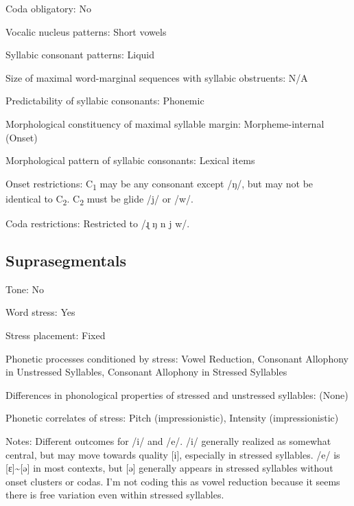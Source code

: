 {\begin{appendixdesc}
\item[Coda obligatory:] No

\item[Vocalic nucleus patterns:] Short vowels

\item[Syllabic consonant patterns:] Liquid

\item[Size of maximal word-marginal sequences with syllabic obstruents:] N/A

\item[Predictability of syllabic consonants:] Phonemic

\item[Morphological constituency of maximal syllable margin:] Morpheme-internal (Onset)

\item[Morphological pattern of syllabic consonants:] Lexical items

\item[Onset restrictions:] C\textsubscript{1} may be any consonant except /ŋ/, but may not be identical to C\textsubscript{2}. C\textsubscript{2} must be glide /j/ or /w/. 

\item[Coda restrictions:] Restricted to /ɻ ŋ n j w/.
\end{appendixdesc}
\subsection*{Suprasegmentals}
\begin{appendixdesc}
\item[Tone:] No

\item[Word stress:] Yes

\item[Stress placement:] Fixed

\item[Phonetic processes conditioned by stress:] Vowel Reduction, Consonant Allophony in Unstressed Syllables, Consonant Allophony in Stressed Syllables

\item[Differences in phonological properties of stressed and unstressed syllables:] (None)

\item[Phonetic correlates of stress:] Pitch (impressionistic), Intensity (impressionistic)

\item[Notes:] Different outcomes for /i/ and /e/. /i/ generally realized as somewhat central, but may move towards quality [i], especially in stressed syllables. /e/ is [ɛ]{\textasciitilde}[ə] in most contexts, but [ə] generally appears in stressed syllables without onset clusters or codas. I’m not coding this as vowel reduction because it seems there is free variation even within stressed syllables.
\end{appendixdesc}
}
